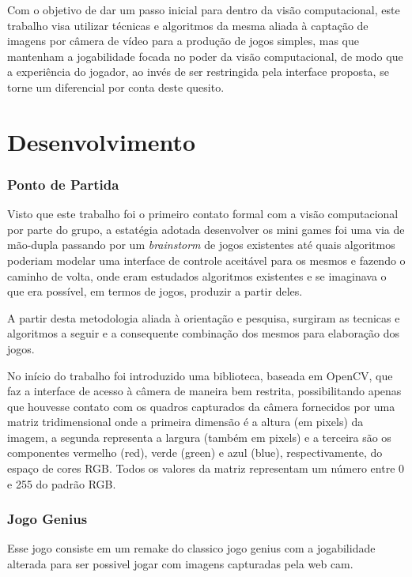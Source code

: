 \documentclass[a4paper]{article}
\begin{document}
Com o objetivo de dar um passo inicial para dentro da visão computacional, este trabalho visa utilizar técnicas e algoritmos da mesma aliada à captação de imagens por câmera de vídeo para a produção de jogos simples, mas que mantenham a jogabilidade focada no poder da visão computacional, de modo que a experiência do jogador, ao invés de ser restringida pela interface proposta, se torne um diferencial por conta deste quesito.



\section{Desenvolvimento}



\subsubsection{Ponto de Partida}


Visto que este trabalho foi o primeiro contato formal com a visão computacional por parte do grupo, a estatégia adotada desenvolver os mini games foi uma via de mão-dupla passando por um \textit{brainstorm} de jogos existentes até quais algoritmos poderiam modelar uma interface de controle aceitável para os mesmos e fazendo o caminho de volta, onde eram estudados algoritmos existentes e se imaginava o que era possível, em termos de jogos, produzir a partir deles.

A partir desta metodologia aliada à orientação e pesquisa, surgiram as tecnicas e algoritmos a seguir e a consequente combinação dos mesmos para elaboração dos jogos. 

No início do trabalho foi introduzido uma biblioteca, baseada em OpenCV, que faz a interface de acesso à câmera de maneira bem restrita, possibilitando apenas que houvesse contato com os quadros capturados da câmera fornecidos por uma matriz tridimensional onde a primeira dimensão é a altura (em pixels) da imagem, a segunda representa a largura (também em pixels) e a terceira são os componentes vermelho (red), verde (green) e azul (blue), respectivamente, do espaço de cores RGB. Todos os valores da matriz representam um número entre 0 e 255 do padrão RGB.


\subsubsection{ Jogo Genius}

Esse jogo consiste em um remake do classico jogo genius com a jogabilidade alterada para ser possivel jogar com imagens capturadas pela web cam.
\end{document}
